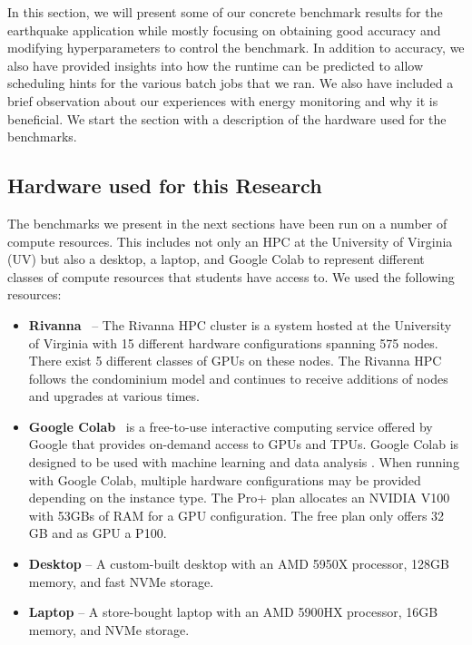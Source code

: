 \documentclass[utf8]{FrontiersinVancouver} %
\begin{document}
In this section, we will present some of our concrete benchmark
results for the earthquake application while mostly focusing on
obtaining good accuracy and modifying hyperparameters to control the
benchmark. In addition to accuracy, we also have provided insights
into how the runtime can be predicted to allow scheduling hints for
the various batch jobs that we ran. We also have included a brief
observation about our experiences with energy monitoring and why it is
beneficial. We start the section with a description of the hardware
used for the benchmarks.


\subsection{Hardware used for this Research}

The benchmarks we present in the next sections have been run on a
number of compute resources. This includes not only an HPC at the
University of Virginia (UV) but also a desktop, a laptop, and Google
Colab to represent different classes of compute resources that
students have access to. We used the following resources:

\begin{itemize}
\item {\bf Rivanna}~\citep{www-rivanna} -- The Rivanna HPC cluster is
  a system hosted at the University of Virginia with 15 different
  hardware configurations spanning 575 nodes.  There exist 5 different
  classes of GPUs on these nodes. The Rivanna HPC follows the
  condominium model and continues to receive additions of nodes and
  upgrades at various times.
\item {\bf Google Colab}~\cite{google-colab} is a free-to-use
  interactive computing service offered by Google that provides
  on-demand access to GPUs and TPUs. Google Colab is designed to be
  used with machine learning and data analysis \cite{google-colab}.
  When running with Google Colab, multiple hardware configurations may
  be provided depending on the instance type. The Pro+ plan allocates
  an NVIDIA V100 with 53GBs of RAM for a GPU configuration. The free
  plan only offers 32 GB and as GPU a P100.
\item {\bf Desktop} -- A custom-built desktop with an AMD 5950X
  processor, 128GB memory, and fast NVMe storage.
\item {\bf Laptop} -- A store-bought laptop with an AMD 5900HX
  processor, 16GB memory, and NVMe storage.

\end{itemize}
\end{document}
